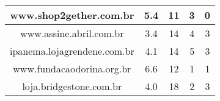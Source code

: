 \begin{center}
\begin{longtable}{|l|l|l|l|l|}
\hline
\multicolumn{1}{|c|}{www.shop2gether.com.br} & \multicolumn{1}{c|}{5.4} & \multicolumn{1}{c|}{11} & \multicolumn{1}{c|}{3} & \multicolumn{1}{c|}{0} \\ 
\hline
\multicolumn{1}{|c|}{www.assine.abril.com.br} & \multicolumn{1}{c|}{3.4} & \multicolumn{1}{c|}{14} & \multicolumn{1}{c|}{4} & \multicolumn{1}{c|}{3} \\ 
\hline
\multicolumn{1}{|c|}{ipanema.lojagrendene.com.br} & \multicolumn{1}{c|}{4.1} & \multicolumn{1}{c|}{14} & \multicolumn{1}{c|}{5} & \multicolumn{1}{c|}{3} \\ 
\hline
\multicolumn{1}{|c|}{www.fundacaodorina.org.br} & \multicolumn{1}{c|}{6.6} & \multicolumn{1}{c|}{12} & \multicolumn{1}{c|}{1} & \multicolumn{1}{c|}{1} \\ 
\hline
\multicolumn{1}{|c|}{loja.bridgestone.com.br} & \multicolumn{1}{c|}{4.0} & \multicolumn{1}{c|}{18} & \multicolumn{1}{c|}{2} & \multicolumn{1}{c|}{3} \\ 
\hline
\end{longtable}
\end{center}


